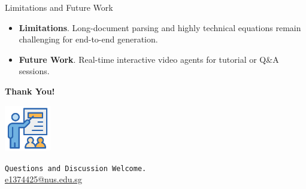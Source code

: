 \documentclass{beamer}
\newcommand{\alertterm}[1]{\alert{\textbf{#1}}}
\begin{document}
\begin{frame}{Limitations and Future Work}
  \begin{itemize}
    \item \alertterm{Limitations}. Long-document parsing and highly technical equations remain challenging for end-to-end generation.
     \item \alertterm{Future Work}. Real-time interactive video agents for tutorial or Q\&A sessions.
  \end{itemize}
\end{frame}
\begin{frame}
  \centering
  \Huge \textbf{Thank You!}
  \vspace{0.7cm}

  \includegraphics[width=0.15\textwidth]{figure/logo_.png}

  \vspace{0.3cm}
  \large
  \texttt{Questions and Discussion Welcome.} \\
  \href{mailto:showlab@nus.edu.sg}{e1374425@nus.edu.sg}
\end{frame}
\end{document}
